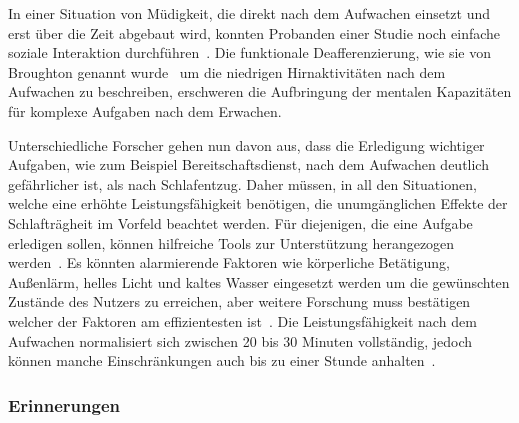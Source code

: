 In einer Situation von Müdigkeit, die direkt nach dem Aufwachen einsetzt und erst über die Zeit abgebaut wird, konnten Probanden einer Studie noch einfache soziale Interaktion durchführen~\cite{dinges1990you}. 
Die funktionale Deafferenzierung, wie sie von Broughton genannt wurde~\cite{broughton1968sleep} um die niedrigen Hirnaktivitäten nach dem Aufwachen zu beschreiben, erschweren die Aufbringung der mentalen Kapazitäten für komplexe Aufgaben nach dem Erwachen.

Unterschiedliche Forscher gehen nun davon aus, dass die Erledigung wichtiger Aufgaben, wie zum Beispiel Bereitschaftsdienst, nach dem Aufwachen deutlich gefährlicher ist, als nach Schlafentzug.
Daher müssen, in all den Situationen, welche eine erhöhte Leistungsfähigkeit benötigen, die unumgänglichen Effekte der Schlafträgheit im Vorfeld beachtet werden. 
Für diejenigen, die eine Aufgabe erledigen sollen, können hilfreiche Tools zur Unterstützung herangezogen werden~\cite{ferrara2000sleep}. 
Es könnten alarmierende Faktoren wie körperliche Betätigung, Außenlärm, helles Licht und kaltes Wasser eingesetzt werden um die gewünschten Zustände des Nutzers zu erreichen, aber weitere Forschung muss bestätigen welcher der Faktoren am effizientesten ist~\cite{ferrara2000sleep}.
Die Leistungsfähigkeit nach dem Aufwachen normalisiert sich zwischen 20 bis 30 Minuten vollständig, jedoch können manche Einschränkungen auch bis zu einer Stunde anhalten~\cite{online:muedesGehirn}.

\subsubsection{Erinnerungen}

